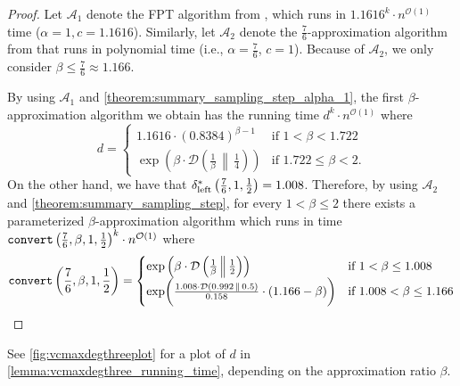 \documentclass[letterpaper,11pt]{article}
\newcommand{\1}[1]{\mathds{1}\left[#1\right]}
\newcommand{\runtime}[1][\alpha, \beta, c, q]{\textnormal{\texttt{convert}}\left(#1\right)}
\newcommand{\D}[2]{\mathcal{D}\left(#1\, \middle\|\,#2 \right)}
\newcommand{\Oh}{\mathcal{O}}
\newcommand{\sdeltal}{\delta^{*}_{\textnormal{left}}}
\begin{document}
\begin{proof}
	Let $\mathcal{A}_1$ denote the FPT algorithm from \cite{xiaoNoteVertexCover2010}, which runs in $1.1616^{k} \cdot n^{\Oh(1)}$ time
	($\alpha = 1, c = 1.1616$).
	Similarly, let $\mathcal{A}_2$ denote the $\frac{7}{6}$-approximation algorithm from \cite{bermanApproximationPropertiesIndependent1999} that runs in polynomial time
	(i.e., $\alpha = \frac{7}{6}$, $c = 1$).
	Because of $\mathcal{A}_2$, we only consider $\beta \leq \frac{7}{6} \approx 1.166$.
	
	By using $\mathcal{A}_1$ and \cref{theorem:summary_sampling_step_alpha_1}, the first $\beta$-approximation algorithm we obtain
	has the running time $d^{k} \cdot n^{\Oh(1)}$ where
		\begin{equation}\label{eq:vc_deg_3_running_time_1}
			d = \begin{cases}
				1.1616 \cdot \left(0.8384\right) ^{\beta - 1} &\text{if } 1 < \beta < 1.722\\
				\exp\left( \beta \cdot \D{\frac{1}{\beta}}{\frac{1}{4}} \right) &\text{if } 1.722 \leq \beta < 2.
			\end{cases}
		\end{equation}
	On the other hand, we have that $\sdeltal\left( \frac{7}{6} ,1,\frac{1}{2}
	\right) = 1.008$. Therefore, by using $\mathcal{A}_2$ and
	\cref{theorem:summary_sampling_step}, for every $1 < \beta \leq
	2$ there exists a parameterized $\beta$-approximation algorithm
	which runs in time $\runtime[\frac{7}{6}, \beta, 1, \frac{1}{2}]^{k}
	\cdot n^{\Oh(1)}$ where
	\begin{equation*}
		\runtime[\frac{7}{6}, \beta, 1, \frac{1}{2}] = \begin{cases}
			\exp\left( \beta \cdot \D{\frac{1}{\beta}}{\frac{1}{2}} \right) &\text{if } 1 < \beta \leq 1.008 \\
			 \exp\biggl( \frac{ 1.008 \cdot \D{ 0.992 }{ 0.5 }  }{ 0.158 } \cdot (1.166 - \beta)  \biggr) &\text{if } 1.008 < \beta \leq 1.166			
		\end{cases}
	\end{equation*}
\end{proof}

See \cref{fig:vcmaxdegthreeplot} for a plot of $d$ in \cref{lemma:vcmaxdegthree_running_time}, depending on
the approximation ratio $\beta$.
\end{document}
